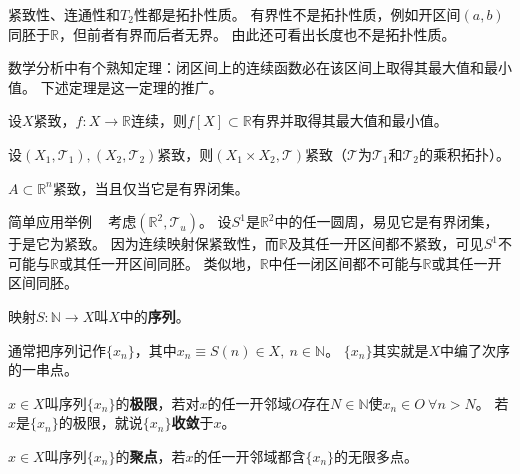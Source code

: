 \begin{example}
	紧致性、连通性和$T_2$性都是拓扑性质。
	有界性不是拓扑性质，例如开区间$(a, b)$同胚于$\mathbb{R}$，但前者有界而后者无界。
	由此还可看出长度也不是拓扑性质。
\end{example}

数学分析中有个熟知定理：闭区间上的连续函数必在该区间上取得其最大值和最小值。
下述定理是这一定理的推广。

\begin{theorem}
	设$X$紧致，$f \colon X \to \mathbb{R}$连续，则$f[X] \subset \mathbb{R}$有界并取得其最大值和最小值。
\end{theorem}

\begin{theorem}
	设$(X_1, \mathscr{T}_1), (X_2, \mathscr{T}_2)$紧致，则$(X_1 \times X_2, \mathscr{T})$紧致（$\mathscr{T}$为$\mathscr{T}_1$和$\mathscr{T}_2$的乘积拓扑）。
\end{theorem}

\begin{theorem}
	$A \subset \mathbb{R}^n$紧致，当且仅当它是有界闭集。
\end{theorem}

简单应用举例 ~ 考虑$(\mathbb{R}^2, \mathscr{T}_u)$。
设$S^1$是$\mathbb{R}^2$中的任一圆周，易见它是有界闭集，于是它为紧致。
因为连续映射保紧致性，而$\mathbb{R}$及其任一开区间都不紧致，可见$S^1$不可能与$\mathbb{R}$或其任一开区间同胚。
类似地，$\mathbb{R}$中任一闭区间都不可能与$\mathbb{R}$或其任一开区间同胚。

\begin{definition}
	映射$S \colon \mathbb{N} \to X$叫$X$中的\textbf{序列}。
\end{definition}

\begin{note}
	通常把序列记作$\{x_n\}$，其中$x_n \equiv S(n) \in X, ~ n \in \mathbb{N}$。
	$\{x_n\}$其实就是$X$中编了次序的一串点。
\end{note}

\begin{definition}
	$x \in X$叫序列$\{x_n\}$的\textbf{极限}，若对$x$的任一开邻域$O$存在$N \in \mathbb{N}$使$x_n \in O ~ \forall n > N$。
	若$x$是$\{x_n\}$的极限，就说$\{x_n\}$\textbf{收敛}于$x$。
\end{definition}

\begin{definition}
	$x \in X$叫序列$\{x_n\}$的\textbf{聚点}，若$x$的任一开邻域都含$\{x_n\}$的无限多点。
\end{definition}

